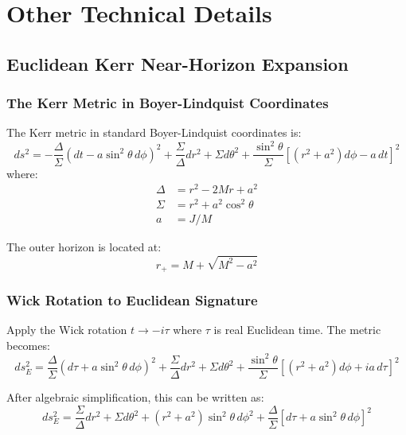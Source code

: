 \documentclass[11pt]{article}
\begin{document}
\section{ Other Technical Details}
\subsection{Euclidean Kerr Near-Horizon Expansion}
\label{subsec:eucl-kerr-nh}

\subsubsection{The Kerr Metric in Boyer-Lindquist Coordinates}

The Kerr metric in standard Boyer-Lindquist coordinates is:
\begin{equation}
ds^2 = -\frac{\Delta}{\Sigma}(dt - a\sin^2\theta\, d\phi)^2 + \frac{\Sigma}{\Delta}dr^2 + \Sigma d\theta^2 + \frac{\sin^2\theta}{\Sigma}[(r^2+a^2)d\phi - a\,dt]^2
\end{equation}
where:
\begin{align}
\Delta &= r^2 - 2Mr + a^2 \\
\Sigma &= r^2 + a^2\cos^2\theta \\
a &= J/M
\end{align}

The outer horizon is located at:
\begin{equation}
r_+ = M + \sqrt{M^2 - a^2}
\end{equation}

\subsubsection{Wick Rotation to Euclidean Signature}

Apply the Wick rotation $t \to -i\tau$ where $\tau$ is real Euclidean time. The metric becomes:
\begin{equation}
ds^2_E = \frac{\Delta}{\Sigma}(d\tau + a\sin^2\theta\, d\phi)^2 + \frac{\Sigma}{\Delta}dr^2 + \Sigma d\theta^2 + \frac{\sin^2\theta}{\Sigma}[(r^2+a^2)d\phi + ia\,d\tau]^2
\end{equation}

After algebraic simplification, this can be written as:
\begin{equation}
ds^2_E = \frac{\Sigma}{\Delta}dr^2 + \Sigma d\theta^2 + (r^2+a^2)\sin^2\theta\, d\phi^2 + \frac{\Delta}{\Sigma}[d\tau + a\sin^2\theta\, d\phi]^2
\end{equation}
\end{document}
